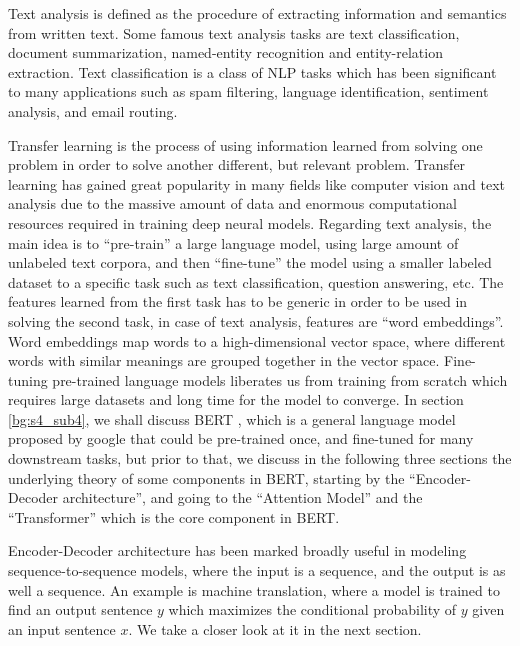 Text analysis is defined as the procedure of extracting information and semantics from written text. Some famous text analysis tasks are text classification, document summarization, named-entity recognition and entity-relation extraction. 
Text classification is a class of \ac{NLP} tasks which has been significant to many applications such as spam filtering, language identification, sentiment analysis, and email routing. 


Transfer learning is the process of using information learned from solving one problem in order to solve another different, but relevant problem. 
Transfer learning has gained great popularity in many fields like computer vision and text analysis due to the massive amount of data and enormous computational resources required in training deep neural models. 
Regarding text analysis, the main idea is to \enquote{pre-train} a large language model, using large amount of unlabeled text corpora, and then \enquote{fine-tune} the model using a smaller labeled dataset to a specific task such as text classification, question answering, etc. 
The features learned from the first task has to be generic in order to be used in solving the second task, in case of text analysis, features are \enquote{word embeddings}. 
Word embeddings map words to a high-dimensional vector space, where different words with similar meanings are grouped together in the vector space. Fine-tuning pre-trained language models liberates us from training from scratch which requires large datasets and long time for the model to converge. 
In section \ref{bg:s4_sub4}, we shall discuss \ac{BERT} \cite{devlin2018bert}, which is a general language model proposed by google that could be pre-trained once, and fine-tuned for many downstream tasks, but prior to that, we discuss in the following three sections the underlying theory of some components in \ac{BERT}, starting by the \enquote{Encoder-Decoder architecture}, and going to the \enquote{Attention Model} and the \enquote{Transformer} which is the core component in \ac{BERT}. 

Encoder-Decoder architecture has been marked broadly useful in modeling sequence-to-sequence models, where the input is a sequence, and the output is as well a sequence. An example is machine translation, where a model is trained to find an output sentence $y$ which maximizes the conditional probability of $y$ given an input sentence $x$. We take a closer look at it in the next section.


 

